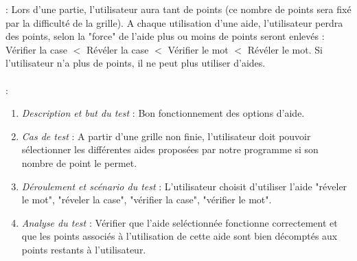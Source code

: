 \documentclass [ 11 pt ] {article}
\begin{document}
 : Lors d'une partie, l'utilisateur aura tant de points (ce nombre de points sera fixé par la difficulté de la grille). A chaque utilisation d'une aide, l'utilisateur perdra des points, selon la "force" de l'aide plus ou moins de points seront enlevés : Vérifier la case $<$ Révéler la case $<$ Vérifier le mot $<$ Révéler le mot. Si l'utilisateur n'a plus de points, il ne peut plus utiliser d'aides. \\ \\
 :
\begin{tcolorbox}[colback=positifC]
            \begin{enumerate}
                \item \textit{Description et but du test} : Bon fonctionnement des options d'aide.\newline
                
                \item \textit{Cas de test} : A partir d'une grille non finie, l'utilisateur doit pouvoir sélectionner les différentes aides proposées par notre programme si son nombre de point le permet.   \newline
                
                \item \textit{Déroulement et scénario du test} : L'utilisateur choisit d'utiliser l'aide "réveler le mot", "réveler la case", "vérifier la case", "vérifier le mot". \newline
                
                \item \textit{Analyse du test} : Vérifier que l'aide seléctionnée fonctionne correctement et que les points associés à l'utilisation de cette aide sont bien décomptés aux points restants à l'utilisateur.
            \end{enumerate}
        \end{tcolorbox}
        
\end{document}
